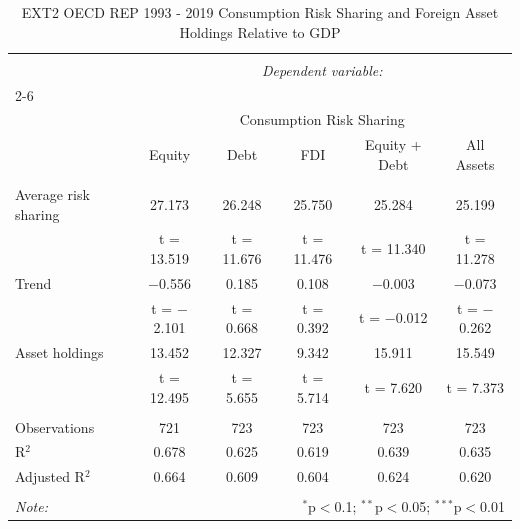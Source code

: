 
\begin{table}[!htbp] \centering 
  \caption{EXT2 OECD REP 1993 - 2019 Consumption Risk Sharing and Foreign Asset Holdings Relative to GDP} 
  \label{} 
\begin{tabular}{@{\extracolsep{5pt}}lccccc} 
\\[-1.8ex]\hline 
\hline \\[-1.8ex] 
 & \multicolumn{5}{c}{\textit{Dependent variable:}} \\ 
\cline{2-6} 
\\[-1.8ex] & \multicolumn{5}{c}{Consumption Risk Sharing} \\ 
 & Equity & Debt & FDI & Equity + Debt & All Assets \\ 
\hline \\[-1.8ex] 
 Average risk sharing & 27.173 & 26.248 & 25.750 & 25.284 & 25.199 \\ 
  & t = 13.519 & t = 11.676 & t = 11.476 & t = 11.340 & t = 11.278 \\ 
  Trend & $-$0.556 & 0.185 & 0.108 & $-$0.003 & $-$0.073 \\ 
  & t = $-$2.101 & t = 0.668 & t = 0.392 & t = $-$0.012 & t = $-$0.262 \\ 
  Asset holdings & 13.452 & 12.327 & 9.342 & 15.911 & 15.549 \\ 
  & t = 12.495 & t = 5.655 & t = 5.714 & t = 7.620 & t = 7.373 \\ 
 \hline \\[-1.8ex] 
Observations & 721 & 723 & 723 & 723 & 723 \\ 
R$^{2}$ & 0.678 & 0.625 & 0.619 & 0.639 & 0.635 \\ 
Adjusted R$^{2}$ & 0.664 & 0.609 & 0.604 & 0.624 & 0.620 \\ 
\hline 
\hline \\[-1.8ex] 
\textit{Note:}  & \multicolumn{5}{r}{$^{*}$p$<$0.1; $^{**}$p$<$0.05; $^{***}$p$<$0.01} \\ 
\end{tabular} 
\end{table} 
